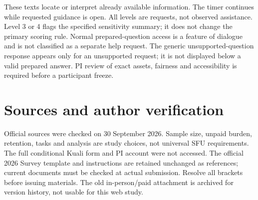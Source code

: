 \documentclass[11pt,letterpaper]{article}
\begin{document}
These texts locate or interpret already available information. The timer continues while requested guidance is open. All levels are requests, not observed assistance. Level 3 or 4 flags the specified sensitivity summary; it does not change the primary scoring rule. Normal prepared-question access is a feature of dialogue and is not classified as a separate help request. The generic unsupported-question response appears only for an unsupported request; it is not displayed below a valid prepared answer. PI review of exact assets, fairness and accessibility is required before a participant freeze.

\section{Sources and author verification}
Official sources were checked on 30 September 2026. Sample size, unpaid burden, retention, tasks and analysis are study choices, not universal SFU requirements. The full conditional Kuali form and PI account were not accessed. The official 2026 Survey template and instructions are retained unchanged as references; current documents must be checked at actual submission. Resolve all brackets before issuing materials. The old in-person/paid attachment is archived for version history, not usable for this web study.
\end{document}
